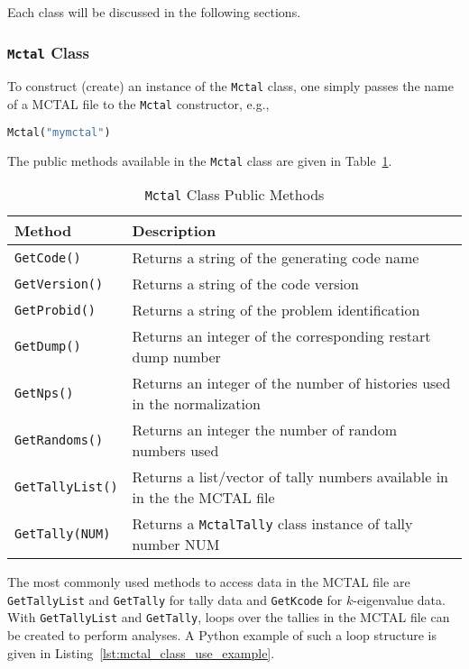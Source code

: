 \documentclass[11pt]{article}
\begin{document}
Each class will be discussed in the following sections.

\subsubsection{\texttt{Mctal} Class}\label{the-mctal-class}

To construct (create) an instance of the \texttt{Mctal} class, one simply passes
the name of a MCTAL file to the \texttt{Mctal} constructor, e.g.,

\begin{lstlisting}[language=Python]
Mctal("mymctal")
\end{lstlisting}

The public methods available in the \texttt{Mctal} class are given in
Table~\ref{tab:mctal_class_public_methods}.

\begin{table}[]
  \begin{center}
  \caption{\texttt{Mctal} Class Public Methods}
  \label{tab:mctal_class_public_methods}
    \begin{tabular}{lp{4in}}
      \toprule
        Method & Description \\
      \midrule
        \texttt{GetCode()}      & Returns a string of the generating code name \\
        \texttt{GetVersion()}   & Returns a string of the code version \\
        \texttt{GetProbid()}    & Returns a string of the problem identification \\
        \texttt{GetDump()}      & Returns an integer of the corresponding restart dump number \\
        \texttt{GetNps()}       & Returns an integer of the number of histories used in the normalization \\
        \texttt{GetRandoms()}   & Returns an integer the number of random numbers used \\
        \texttt{GetTallyList()} & Returns a list/vector of tally numbers available in in the the MCTAL file \\
        \texttt{GetTally(NUM)}  & Returns a \texttt{MctalTally} class instance of tally number NUM \\
      \bottomrule
    \end{tabular}
  \end{center}
\end{table}

The most commonly used methods to access data in the MCTAL file are
\texttt{GetTallyList} and \texttt{GetTally} for tally data and \texttt{GetKcode}
for $k$-eigenvalue data. With \texttt{GetTallyList} and \texttt{GetTally}, loops
over the tallies in the MCTAL file can be created to perform analyses. A
Python example of such a loop structure is given in
Listing~\ref{lst:mctal_class_use_example}.
\end{document}
